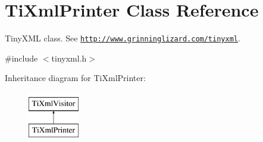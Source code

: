 \hypertarget{class_ti_xml_printer}{}\section{Ti\+Xml\+Printer Class Reference}
\label{class_ti_xml_printer}


Tiny\+X\+ML class. See \href{http://www.grinninglizard.com/tinyxml}{\tt http\+://www.\+grinninglizard.\+com/tinyxml}.  




{\ttfamily \#include $<$tinyxml.\+h$>$}

Inheritance diagram for Ti\+Xml\+Printer\+:\begin{figure}[H]
\begin{center}
\leavevmode
\includegraphics[height=2.000000cm]{class_ti_xml_printer}
\end{center}
\end{figure}
